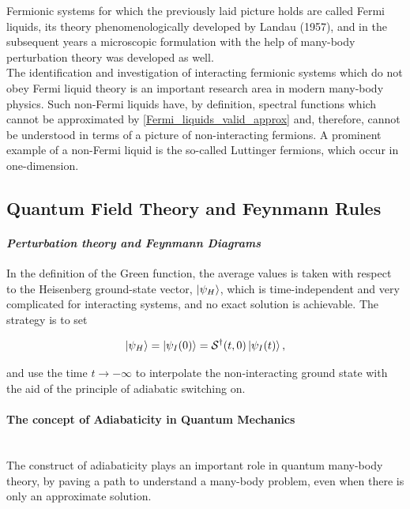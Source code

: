 \documentclass{homework}
\begin{document}
\begin{tcolorbox}[colback=yellow, 
title = Physical Context]

Fermionic systems for which the previously laid picture holds are called Fermi liquids, its theory phenomenologically developed by Landau (1957), and in the subsequent years a microscopic formulation with the help of many-body perturbation theory was developed as well. \\

The identification and investigation of interacting fermionic systems which do not obey Fermi liquid theory is an important research area in modern many-body physics. Such non-Fermi liquids have, by definition, spectral functions which cannot be approximated by \cref{Fermi_liquids_valid_approx} and, therefore, cannot be understood in terms of a picture of non-interacting fermions. A prominent example of a non-Fermi liquid is the so-called Luttinger fermions, which occur in one-dimension.  
\end{tcolorbox}

\subsection{\textbf{Quantum Field Theory and Feynmann Rules}}

\paragraph{\textit{Perturbation theory and Feynmann Diagrams}}

In the definition of the Green function, the average values is taken with respect to the Heisenberg ground-state vector, $\ket{\psi_H}$, which is time-independent and very complicated for interacting systems, and no exact solution is achievable. The strategy is to set 

$$
    \ket{\psi_H} = \ket{\psi_I (0)} = \mathcal{S}^\dagger(t,0) \ket{\psi_I (t)},
$$

and use the time $t \rightarrow -\infty$ to interpolate the non-interacting ground state with the aid of the principle of adiabatic switching on. \\

\paragraph{The concept of Adiabaticity in Quantum Mechanics} \\

The construct of adiabaticity plays an important role in quantum many-body theory, by paving a path to understand a many-body problem, even when there is only an approximate solution. \\
\end{document}
